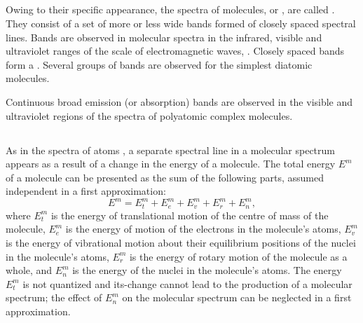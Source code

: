\subsection{}\label{39.5.1} Owing to their specific appearance, the spectra of molecules, or , are called . They consist of a set of more or less wide bands formed of closely spaced spectral lines. Bands are observed in molecular spectra in the infrared, visible
and ultraviolet ranges of the scale of electromagnetic waves,
. Closely spaced bands form a . Several groups of bands are observed for the simplest diatomic molecules.

Continuous broad emission (or absorption) bands are observed in the visible and ultraviolet regions of the spectra of polyatomic complex molecules.

\subsection{}\label{39.5.2} As in the spectra of atoms , a separate spectral line in a molecular spectrum appears as a result of a change in the energy of a molecule. The total energy $E^{m}$ of a molecule can be presented as the sum of the following parts, assumed independent in a first approximation:
\begin{equation*}%
E^{m} = E^{m}_{t} + E^{m}_{e} + E^{m}_{v} + E^{m}_{r} + E^{m}_{n}, 
\end{equation*}
where $E^{m}_{t}$ is the energy of translational motion of the centre of mass  of the molecule, $E^{m}_{e}$ is the energy of motion of the electrons in the molecule's atoms, $E^{m}_{v}$ is the energy of vibrational motion about their equilibrium positions of the nuclei in the molecule's
atoms, $E^{m}_{r}$ is the energy of rotary motion of the molecule as a whole, and $E^{m}_{n}$ is the energy of the nuclei in the molecule's atoms. The energy $E^{m}_{t}$ is not quantized  and its-change cannot lead to the production of a molecular spectrum; the effect of $E^{m}_{n}$ on the molecular spectrum can be neglected in a first approximation.

